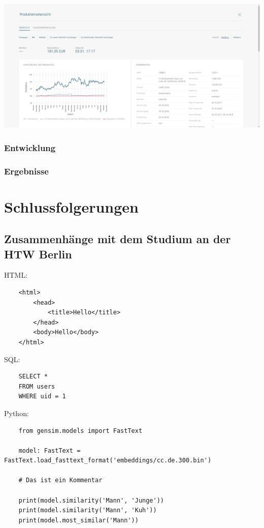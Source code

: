 \documentclass[chapterprefix=false, 12pt, a4paper, oneside, parskip=half, listof=totoc, bibliography=totoc, numbers=noendperiod]{scrbook}
\begin{document}
    \includegraphics[width=1.00\textwidth]{img/derifin.png}

    \subsection{Entwicklung}

    \subsection{Ergebnisse}

    \chapter{Schlussfolgerungen}

    \section{Zusammenhänge mit dem Studium an der HTW Berlin}

    HTML:

    \begin{verbatim}
    <html>
        <head>
            <title>Hello</title>
        </head>
        <body>Hello</body>
    </html>
    \end{verbatim}

    SQL:

    \begin{verbatim}
    SELECT *
    FROM users
    WHERE uid = 1
    \end{verbatim}

    Python:

    \begin{verbatim}
    from gensim.models import FastText

    model: FastText = FastText.load_fasttext_format('embeddings/cc.de.300.bin')

    # Das ist ein Kommentar

    print(model.similarity('Mann', 'Junge'))
    print(model.similarity('Mann', 'Kuh'))
    print(model.most_similar('Mann'))
    \end{verbatim}
\end{document}
